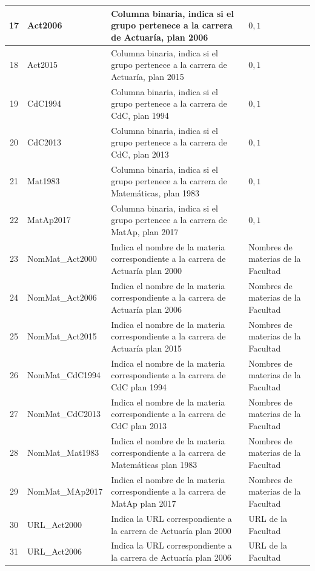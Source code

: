 {\begin{longtable}{|c|l|p{7cm}|p{2.6cm}|}
\hline 
17 & Act2006 & Columna binaria, indica si el grupo pertenece a la carrera de Actuaría, plan 2006 & $0,1$ \\ 
\hline 
18 & Act2015 & Columna binaria, indica si el grupo pertenece a la carrera de Actuaría, plan 2015 & $0,1$ \\ 
\hline 
19 & CdC1994 & Columna binaria, indica si el grupo pertenece a la carrera de CdC, plan 1994 & $0,1$ \\ 
\hline 
20 & CdC2013 & Columna binaria, indica si el grupo pertenece a la carrera de CdC, plan 2013 & $0,1$ \\ 
\hline 
21 & Mat1983 & Columna binaria, indica si el grupo pertenece a la carrera de Matemáticas, plan 1983 & $0,1$ \\ 
\hline 
22 & MatAp2017 & Columna binaria, indica si el grupo pertenece a la carrera de MatAp, plan 2017 & $0,1$ \\ 
\hline 
23 & NomMat\_Act2000 & Indica el nombre de la materia correspondiente a la carrera de Actuaría plan 2000 & Nombres de materias de la Facultad \\ 
\hline 
24 & NomMat\_Act2006 & Indica el nombre de la materia correspondiente a la carrera de Actuaría plan 2006 & Nombres de materias de la Facultad \\ 
\hline 
25 & NomMat\_Act2015 & Indica el nombre de la materia correspondiente a la carrera de Actuaría plan 2015 & Nombres de materias de la Facultad \\ 
\hline 
26 & NomMat\_CdC1994 & Indica el nombre de la materia correspondiente a la carrera de CdC plan 1994 & Nombres de materias de la Facultad \\ 
\hline 
27 & NomMat\_CdC2013 & Indica el nombre de la materia correspondiente a la carrera de CdC plan 2013 & Nombres de materias de la Facultad \\ 
\hline 
28 & NomMat\_Mat1983 & Indica el nombre de la materia correspondiente a la carrera de Matemáticas plan 1983 & Nombres de materias de la Facultad \\ 
\hline 
29 & NomMat\_MAp2017 & Indica el nombre de la materia correspondiente a la carrera de MatAp plan 2017 & Nombres de materias de la Facultad \\ 
\hline 
30 & URL\_Act2000 & Indica la URL correspondiente a la carrera de Actuaría plan 2000 & URL de la Facultad \\ 
\hline 
31 & URL\_Act2006 & Indica la URL correspondiente a la carrera de Actuaría plan 2006 & URL de la Facultad \\ 
\hline 

\end{longtable}}
